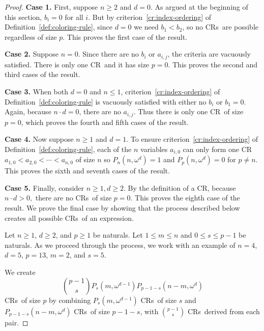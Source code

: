 \documentclass[10pt,a4paper]{article}
\newcommand{\om}{\omega}
\newcommand{\crulenospace}{CR}
\newcommand{\crule}{\crulenospace~}
\newcommand{\crules}{\crulenospace s~}
\newcommand{\case}[1]{\textbf{Case #1.}}
\newcommand{\numpoints}{n}
\newcommand{\inumpoints}{i}
\newcommand{\idegr}{j}
\newcommand{\commonconst}{a}
\newcommand{\rareconst}{b}
\theoremstyle{plain}
\theoremstyle{definition}
\begin{document}
\begin{proof}

\case{1} First, suppose $\numpoints \geq 2$ and $d = 0$. As argued at the beginning of this section, $\rareconst_{\inumpoints}= 0$ for all $\inumpoints$. But by criterion~\ref{cr:index-ordering} of Definition~\ref{def:coloring-rule}, since $d = 0$ we need $\rareconst_1 < \rareconst_2$, so no \crules are possible regardless of size $p$. This proves the first case of the result.

\case{2} Suppose $\numpoints = 0$. 
Since there are no $\rareconst_{\inumpoints}$ or $\commonconst_{\inumpoints,\idegr}$, the criteria are vacuously satisfied. There is only one \crule and it has size $p = 0$. This proves the second and third cases of the result.

\case{3} When both $d = 0$ and $\numpoints \leq 1$, 
criterion~\ref{cr:index-ordering} of Definition~\ref{def:coloring-rule} is
vacuously satisfied with either no $\rareconst_{\inumpoints}$ or $\rareconst_1 = 0$. Again, because $\numpoints \cdot d = 0$, there are no $\commonconst_{\inumpoints,\idegr}$. Thus there is only one \crule of size $p=0$, which proves the fourth and fifth cases of the result.

\case{4} Now suppose $\numpoints \geq 1$ and $d = 1$. To ensure criterion~\ref{cr:index-ordering} of Definition~\ref{def:coloring-rule}, each of the $\numpoints$ variables $\commonconst_{\inumpoints,0}$ can only form one \crule $\commonconst_{1,0} < \commonconst_{2,0} < \cdots < \commonconst_{\numpoints,0}$ of size $\numpoints$ so $P_{\numpoints}\left(\numpoints, \om^d\right) = 1$ and $P_p\left(\numpoints, \om^d\right) = 0$ for $p \neq \numpoints$. This proves the sixth and seventh cases of the result.

\case{5} Finally, consider $\numpoints \geq 1, d \geq 2$. By the definition of a \crulenospace, because $\numpoints \cdot d > 0,$ there are no \crules of size $p=0.$ This proves the eighth
case of the result.
We prove the final case by showing that the process described below creates all possible \crules of an expression.

Let $\numpoints \geq 1$, $d \geq 2$, and $p \geq 1$ be naturals. Let $1 \leq m \leq \numpoints$ and $0 \leq s \leq p-1$ be naturals. As we proceed through the process, we work with an example of $\numpoints = 4$, $d = 5$, $p=13$, $m=2$, and $s=5$.

We create $$\binom{p-1}{s} P_s \left( m,\om^{d-1} \right) P_{p-1-s} \left( \numpoints-m,\om^d \right)$$ \crules of size $p$ by combining $P_s \left( m,\om^{d-1} \right)$ \crules of size $s$ and $P_{p-1-s} \left( \numpoints-m,\om^d \right)$ \crules of size $p-1-s$, with $\binom{p-1}{s}$ \crules derived from each pair.


\end{proof}
\end{document}
